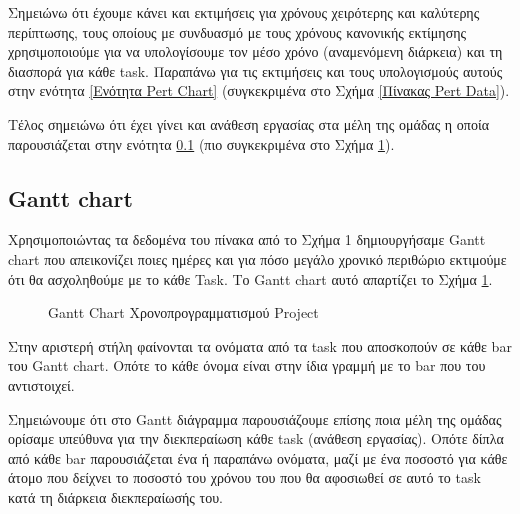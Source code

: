 \documentclass[12pt,a4paper]{article}
\begin{document}
Σημειώνω ότι έχουμε κάνει και εκτιμήσεις για χρόνους χειρότερης και καλύτερης περίπτωσης, τους οποίους με συνδυασμό με τους χρόνους κανονικής εκτίμησης χρησιμοποιούμε για να υπολογίσουμε τον μέσο χρόνο (αναμενόμενη διάρκεια) και τη διασπορά για κάθε task. Παραπάνω για τις εκτιμήσεις και τους υπολογισμούς αυτούς στην ενότητα \ref{Ενότητα Pert Chart} (συγκεκριμένα στο Σχήμα \ref{Πίνακας Pert Data}).

Τέλος σημειώνω ότι έχει γίνει και ανάθεση εργασίας στα μέλη της ομάδας η οποία παρουσιάζεται στην ενότητα \ref{Ενότητα Gantt Chart} (πιο συγκεκριμένα στο Σχήμα \ref{Gantt Chart Χρονοπρογραμματισμού Project}).

\subsection{Gantt chart}
\label{Ενότητα Gantt Chart}
Χρησιμοποιώντας τα δεδομένα του πίνακα από το Σχήμα 1 δημιουργήσαμε Gantt chart που απεικονίζει ποιες ημέρες και για πόσο μεγάλο χρονικό περιθώριο εκτιμούμε ότι θα ασχοληθούμε με το κάθε Task. Το Gantt chart αυτό απαρτίζει το Σχήμα \ref{Gantt Chart Χρονοπρογραμματισμού Project}.

\begin{figure}[H]
	\caption{Gantt Chart Χρονοπρογραμματισμού Project}
	\label{Gantt Chart Χρονοπρογραμματισμού Project}
\end{figure}

Στην αριστερή στήλη φαίνονται τα ονόματα από τα task που αποσκοπούν σε κάθε bar του Gantt chart. Οπότε το κάθε όνομα είναι στην ίδια γραμμή με το bar που του αντιστοιχεί.

Σημειώνουμε ότι στο Gantt διάγραμμα παρουσιάζουμε επίσης ποια μέλη της ομάδας ορίσαμε υπεύθυνα για την διεκπεραίωση κάθε task (ανάθεση εργασίας). Οπότε δίπλα από κάθε bar παρουσιάζεται ένα ή παραπάνω ονόματα, μαζί με ένα ποσοστό για κάθε άτομο που δείχνει το ποσοστό του χρόνου του που θα αφοσιωθεί σε αυτό το task κατά τη διάρκεια διεκπεραίωσής του.
\end{document}
